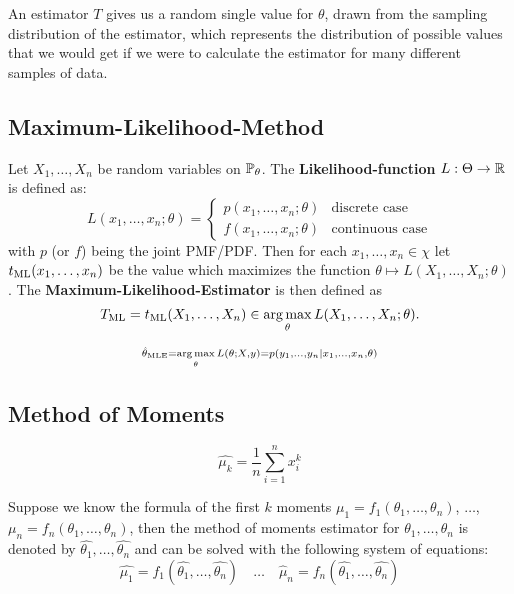 An estimator $T$ gives us a random single value for $\theta$, drawn from the sampling distribution of the estimator, which represents the distribution of possible values that we would get if we were to calculate the estimator for many different samples of data.

\subsection{Maximum-Likelihood-Method}
Let \(X_1, \ldots, X_n\) be random variables on \(\P_\theta\). The \textbf{Likelihood-function} \(L: \Theta \to \R\) is defined as:
\[L(x_1, \ldots, x_n ; \theta) = \begin{cases}
  p(x_1, \ldots, x_n ; \theta) & \text{discrete case} \\
  f(x_1, \ldots, x_n ; \theta) & \text{continuous case}
\end{cases}\]
with \(p\) (or \(f\)) being the joint PMF/PDF.
Then for each \(x_1, \ldots, x_n \in \chi\) let \(t_{\ML}(x_1, \ldots, x_n)\) be the value which maximizes the function \(\theta \mapsto L(X_1, \ldots, X_n ; \theta)\).
The \textbf{Maximum-Likelihood-Estimator} is then defined as
\[T_{\ML} = t_{\ML}(X_1, \ldots, X_n) \in \underset{\theta}{\arg\max} \, L(X_1, \ldots, X_n ; \theta).\]

\vspace{-10pt}
\begin{note*}
  \[\scriptstyle \hat{\theta}_{\MLE} = \underset{\theta}{\arg\max} \, L(\theta; X, y) = p(y_1, \ldots, y_n \mid x_1, \ldots, x_n, \theta)\]
\end{note*}

\subsection{Method of Moments}
\begin{definition*}
  \[\hat{\mu_k} = \frac{1}{n} \sum_{i=1}^n x_i^k\]
\end{definition*}

Suppose we know the formula of the first \(k\) moments \(\mu_1 = f_1(\theta_1, \ldots, \theta_n)\), \(\ldots\), \(\mu_n = f_n(\theta_1, \ldots, \theta_n)\), then the method of moments estimator for \(\theta_1, \ldots, \theta_n\) is denoted by \(\hat{\theta_1}, \ldots, \hat{\theta_n}\) and can be solved with the following system of equations:
\[\hat{\mu_1} = f_1(\hat{\theta_1}, \ldots, \hat{\theta_n}) \quad \ldots \quad \hat{\mu}_n = f_n(\hat{\theta_1}, \ldots, \hat{\theta_n})\]

